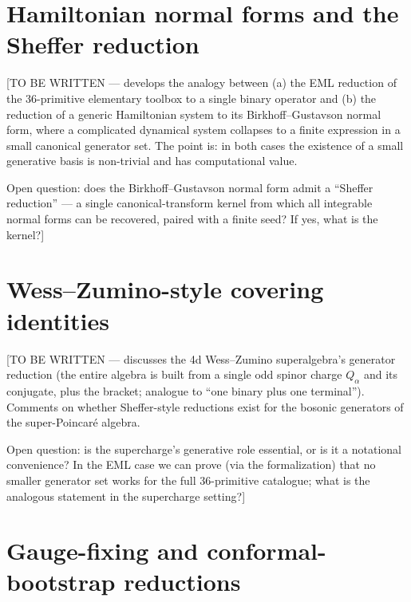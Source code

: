 \documentclass[11pt,a4paper]{article}
\begin{document}
\section{Hamiltonian normal forms and the Sheffer reduction}
\label{sec:hamiltonian}

[TO BE WRITTEN — develops the analogy between (a) the EML reduction
of the 36-primitive elementary toolbox to a single binary operator
and (b) the reduction of a generic Hamiltonian system to its
Birkhoff--Gustavson normal form, where a complicated dynamical
system collapses to a finite expression in a small canonical
generator set. The point is: in both cases the existence of a small
generative basis is non-trivial and has computational value.

Open question: does the Birkhoff--Gustavson normal form admit a
``Sheffer reduction'' --- a single canonical-transform kernel from
which all integrable normal forms can be recovered, paired with a
finite seed? If yes, what is the kernel?]

\section{Wess--Zumino-style covering identities}
\label{sec:wess-zumino}

[TO BE WRITTEN — discusses the 4d Wess--Zumino superalgebra's
generator reduction (the entire algebra is built from a single odd
spinor charge $Q_\alpha$ and its conjugate, plus the bracket; analogue
to ``one binary plus one terminal''). Comments on whether
Sheffer-style reductions exist for the bosonic generators of the
super-Poincaré algebra.

Open question: is the supercharge's generative role essential, or is
it a notational convenience? In the EML case we can prove (via the
formalization) that no smaller generator set works for the full
36-primitive catalogue; what is the analogous statement in the
supercharge setting?]

\section{Gauge-fixing and conformal-bootstrap reductions}
\label{sec:cft}
\end{document}
